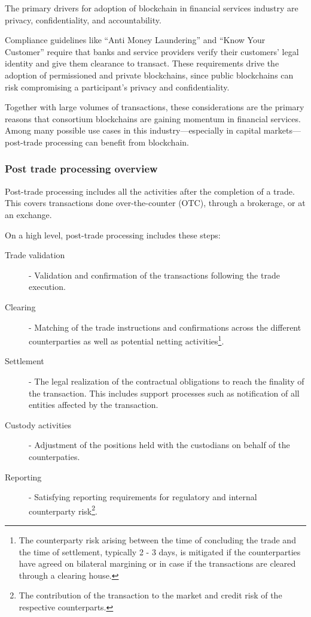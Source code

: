 The primary drivers for adoption of blockchain in financial services industry are privacy, confidentiality, and accountability.

Compliance guidelines like “Anti Money Laundering” and “Know Your Customer” require that banks and service providers verify their customers' legal identity and give them clearance to transact. These requirements drive the adoption of permissioned and private blockchains, since public blockchains can risk compromising a participant's privacy and confidentiality.

Together with large volumes of transactions, these considerations are the primary reasons that consortium blockchains are gaining momentum in financial services. Among many possible use cases in this industry---especially in capital markets---post-trade processing can benefit from blockchain.

\subsubsection{Post trade processing overview}

Post-trade processing includes all the activities after the completion of a trade. This covers transactions done over-the-counter (OTC), through a brokerage, or at an exchange.

On a high level, post-trade processing includes these steps:
\begin{description}
\item [Trade validation] - Validation and confirmation of the transactions following the trade execution. 
\item [Clearing] - Matching of the trade instructions and confirmations across the different counterparties as well as potential netting activities\footnote{The counterparty risk arising between the time of concluding the trade and the time of settlement, typically 2 - 3 days, is mitigated if the counterparties have agreed on bilateral margining or in case if the transactions are cleared through a clearing house.}. 
\item [Settlement] - The legal realization of the contractual obligations to reach the finality of the transaction. This includes support processes such as notification of all entities affected by the transaction.
\item [Custody activities] - Adjustment of the positions held with the custodians on behalf of the counterpaties.
\item [Reporting] - Satisfying reporting requirements for regulatory and internal counterparty risk\footnote{The contribution of the transaction to the market and credit risk of the respective counterparts.}.
\end{description}


